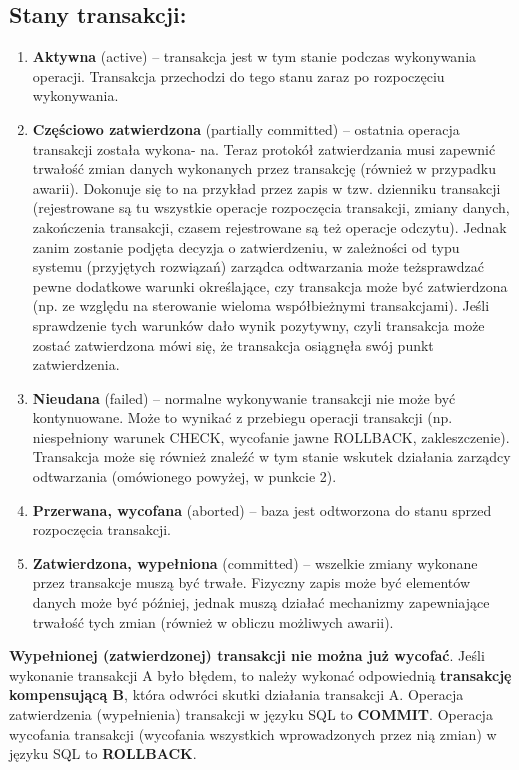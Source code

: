 \documentclass[main.tex]{subfiles}
\begin{document}
    \subsection{Stany transakcji:}
    \begin{enumerate}
        \item \textbf{Aktywna} (active) – transakcja jest w tym stanie podczas wykonywania operacji. Transakcja
        przechodzi do tego stanu zaraz po rozpoczęciu wykonywania.

        \item \textbf{Częściowo zatwierdzona} (partially committed) – ostatnia operacja transakcji została wykona-
        na. Teraz protokół zatwierdzania musi zapewnić trwałość zmian danych wykonanych przez
        transakcję (również w przypadku awarii). Dokonuje się to na przykład przez zapis w tzw. dzienniku
        transakcji (rejestrowane są tu wszystkie operacje rozpoczęcia transakcji, zmiany danych,
        zakończenia transakcji, czasem rejestrowane są też operacje odczytu). Jednak zanim zostanie
        podjęta decyzja o zatwierdzeniu, w zależności od typu systemu (przyjętych rozwiązań) zarządca
        odtwarzania może teżsprawdzać pewne dodatkowe warunki określające, czy transakcja może być
        zatwierdzona (np. ze względu na sterowanie wieloma współbieżnymi transakcjami). Jeśli
        sprawdzenie tych warunków dało wynik pozytywny, czyli transakcja może zostać zatwierdzona
        mówi się, że transakcja osiągnęła swój punkt zatwierdzenia.
        \item \textbf{Nieudana} (failed) – normalne wykonywanie transakcji nie może być kontynuowane. Może to wynikać z przebiegu operacji transakcji (np. niespełniony warunek CHECK, wycofanie jawne
        ROLLBACK, zakleszczenie). Transakcja może się również znaleźć w tym stanie wskutek działania
        zarządcy odtwarzania (omówionego powyżej, w punkcie 2).
        \item \textbf{Przerwana, wycofana} (aborted) – baza jest odtworzona do stanu sprzed rozpoczęcia
        transakcji.
        \item \textbf{Zatwierdzona, wypełniona} (committed) – wszelkie zmiany wykonane przez transakcje muszą
        być trwałe. Fizyczny zapis może być elementów danych może być później, jednak muszą działać
        mechanizmy zapewniające trwałość tych zmian (również w obliczu możliwych awarii).
    \end{enumerate}

    \textbf{Wypełnionej (zatwierdzonej) transakcji nie można już wycofać}. Jeśli wykonanie transakcji A
    było błędem, to należy wykonać odpowiednią \textbf{transakcję kompensującą B}, która odwróci skutki
    działania transakcji A.
    Operacja zatwierdzenia (wypełnienia) transakcji w języku SQL to \textbf{COMMIT}.
    Operacja wycofania transakcji (wycofania wszystkich wprowadzonych przez nią zmian) w języku
    SQL to \textbf{ROLLBACK}.
\end{document}
